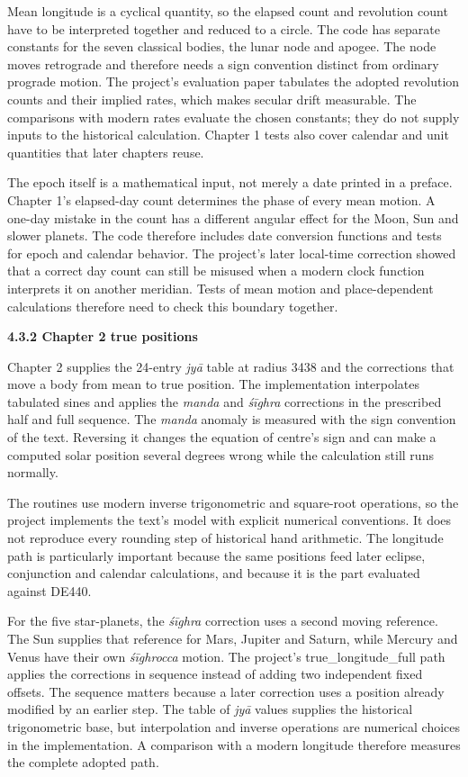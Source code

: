 \documentclass[
]{article}
\begin{document}
Mean longitude is a cyclical quantity, so the elapsed count and
revolution count have to be interpreted together and reduced to a
circle. The code has separate constants for the seven classical bodies,
the lunar node and apogee. The node moves retrograde and therefore needs
a sign convention distinct from ordinary prograde motion. The project's
evaluation paper tabulates the adopted revolution counts and their
implied rates, which makes secular drift measurable. The comparisons
with modern rates evaluate the chosen constants; they do not supply
inputs to the historical calculation. Chapter 1 tests also cover
calendar and unit quantities that later chapters reuse.

The epoch itself is a mathematical input, not merely a date printed in a
preface. Chapter 1's elapsed-day count determines the phase of every
mean motion. A one-day mistake in the count has a different angular
effect for the Moon, Sun and slower planets. The code therefore includes
date conversion functions and tests for epoch and calendar behavior. The
project's later local-time correction showed that a correct day count
can still be misused when a modern clock function interprets it on
another meridian. Tests of mean motion and place-dependent calculations
therefore need to check this boundary together.

\textbf{4.3.2 Chapter 2 true positions}

Chapter 2 supplies the 24-entry \emph{jyā} table at radius 3438 and the
corrections that move a body from mean to true position. The
implementation interpolates tabulated sines and applies the \emph{manda}
and \emph{śīghra} corrections in the prescribed half and full sequence.
The \emph{manda} anomaly is measured with the sign convention of the
text. Reversing it changes the equation of centre's sign and can make a
computed solar position several degrees wrong while the calculation
still runs normally.

The routines use modern inverse trigonometric and square-root
operations, so the project implements the text's model with explicit
numerical conventions. It does not reproduce every rounding step of
historical hand arithmetic. The longitude path is particularly important
because the same positions feed later eclipse, conjunction and calendar
calculations, and because it is the part evaluated against DE440.

For the five star-planets, the \emph{śīghra} correction uses a second
moving reference. The Sun supplies that reference for Mars, Jupiter and
Saturn, while Mercury and Venus have their own \emph{śīghrocca} motion.
The project's true\_longitude\_full path applies the corrections in
sequence instead of adding two independent fixed offsets. The sequence
matters because a later correction uses a position already modified by
an earlier step. The table of \emph{jyā} values supplies the historical
trigonometric base, but interpolation and inverse operations are
numerical choices in the implementation. A comparison with a modern
longitude therefore measures the complete adopted path.
\end{document}

